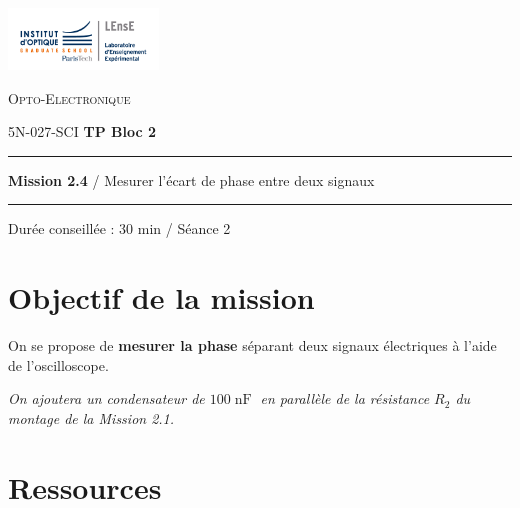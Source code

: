 \newpage
\pagestyle{empty}

\begin{minipage}[c]{.25\linewidth}
	\includegraphics[width=4cm]{images/Logo-LEnsE.png}
\end{minipage} \hfill
\begin{minipage}[c]{.4\linewidth}

\begin{center}
\vspace{0.3cm}
{\Large \textsc{Opto-Electronique}}

\medskip

5N-027-SCI \qquad \textbf{\Large TP Bloc 2}

\end{center}
\end{minipage}\hfill

\vspace{0.5cm}

\noindent \rule{\linewidth}{1pt}

{\noindent\Large \textbf{Mission 2.4} / Mesurer l'écart de phase entre deux signaux} 

\noindent \rule{\linewidth}{1pt}

\vspace{-0.5cm}

\begin{center}

Durée conseillée : 30 min / Séance 2

\end{center}

\section{Objectif de la mission}
\label{mission24}

On se propose de \textbf{mesurer la phase} séparant deux signaux électriques à l'aide de l'oscilloscope.

\textit{On ajoutera un condensateur de $100\operatorname{nF}$ en parallèle de la résistance $R_2$ du montage de la Mission 2.1.}


\section{Ressources}

